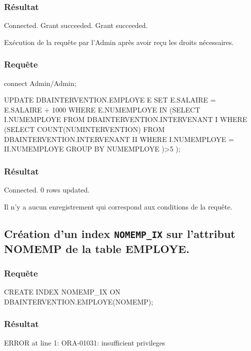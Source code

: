 \documentclass[•]{article}
\begin{document}
\subsubsection{Résultat}
\begin{sql}
Connected.
Grant succeeded.
Grant succeeded.
\end{sql}
\textrm{Exécution de la requête par l'Admin après avoir reçu les droits nécessaires.}

\subsubsection{Requête}
\begin{sql}
connect Admin/Admin;
	
UPDATE DBAINTERVENTION.EMPLOYE E 
SET E.SALAIRE = E.SALAIRE + 1000 
WHERE E.NUMEMPLOYE IN 
	(SELECT I.NUMEMPLOYE 
	FROM DBAINTERVENTION.INTERVENANT I 
	WHERE (SELECT COUNT(NUMINTERVENTION) 
		   FROM DBAINTERVENTION.INTERVENANT II
		   WHERE I.NUMEMPLOYE = II.NUMEMPLOYE
		   GROUP BY NUMEMPLOYE 
		   )>5
	);
\end{sql}

\subsubsection{Résultat}
\begin{sql}
Connected.
0 rows updated.
\end{sql}

\textrm{Il n'y a aucun enregistrement qui correspond aux conditions de la requête.}


\subsection{Création d'un index \texttt{NOMEMP\_IX} sur l’attribut NOMEMP de la table EMPLOYE.}
\subsubsection{Requête}
\begin{sql}
CREATE INDEX NOMEMP_IX ON DBAINTERVENTION.EMPLOYE(NOMEMP);
\end{sql}

\subsubsection{Résultat}
\begin{sql}
ERROR at line 1:
ORA-01031: insufficient privileges
\end{sql}
\end{document}
